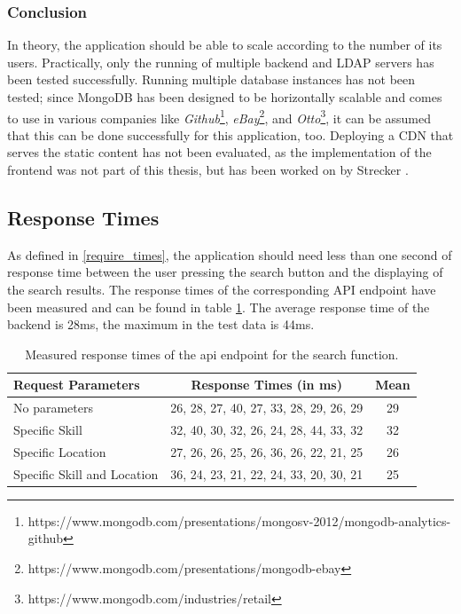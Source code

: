 \newpage

\subsubsection{Conclusion}
In theory, the application should be able to scale according to the number of its users. Practically, only the running of multiple backend and LDAP servers has been tested successfully. Running multiple database instances has not been tested; since MongoDB has been designed to be horizontally scalable and comes to use in various companies like
\textit{Github}\footnote{https://www.mongodb.com/presentations/mongosv-2012/mongodb-analytics-github},
\textit{eBay}\footnote{https://www.mongodb.com/presentations/mongodb-ebay}, and
\textit{Otto}\footnote{https://www.mongodb.com/industries/retail}, it can be assumed that this can be done successfully for this application, too.
Deploying a CDN that serves the static content has not been evaluated, as the implementation of the frontend was not part of this thesis, but has been worked on by Strecker \cite{strecker}.

\subsection{Response Times}
\label{resptime}
As defined in \ref{require_times}, the application should need less than one second of response time between the user pressing the search button and the
displaying of the search results. The response times of the corresponding API endpoint have been measured and can be found in table \ref{tab:responsetimes}.
The average response time of the backend is 28ms, the maximum in the test data is 44ms.

\begin{table}[H]
\centering
  \begin{tabular}{l|c|c|}
		Request Parameters                    & Response Times (in ms)                & Mean\\
		\hline
		No parameters               & 26, 28, 27, 40, 27, 33, 28, 29, 26, 29 & 29\\
		Specific Skill              & 32, 40, 30, 32, 26, 24, 28, 44, 33, 32 & 32\\
		Specific Location           & 27, 26, 26, 25, 26, 36, 26, 22, 21, 25 & 26\\
		Specific Skill and Location & 36, 24, 23, 21, 22, 24, 33, 20, 30, 21 & 25\\
  \end{tabular}

\caption[API Response Times]{Measured response times of the api endpoint for the search function.}
\label{tab:responsetimes}
\end{table}

